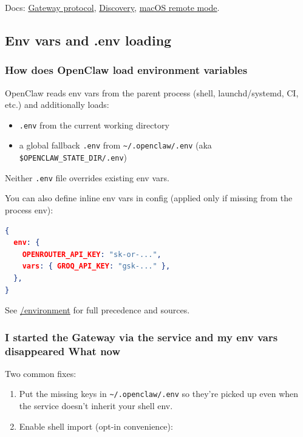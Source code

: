 Docs: \href{/gateway/protocol}{Gateway protocol}, \href{/gateway/discovery}{Discovery}, \href{/platforms/mac/remote}{macOS remote mode}.

\subsection{Env vars and .env loading}


\subsubsection{How does OpenClaw load environment variables}


OpenClaw reads env vars from the parent process (shell, launchd/systemd, CI, etc.) and additionally loads:

\begin{itemize}
  \item \texttt{.env} from the current working directory
  \item a global fallback \texttt{.env} from \texttt{\textasciitilde{}/.openclaw/.env} (aka \texttt{\$OPENCLAW\_STATE\_DIR/.env})
\end{itemize}


Neither \texttt{.env} file overrides existing env vars.

You can also define inline env vars in config (applied only if missing from the process env):

\begin{lstlisting}[language=json]
{
  env: {
    OPENROUTER_API_KEY: "sk-or-...",
    vars: { GROQ_API_KEY: "gsk-..." },
  },
}
\end{lstlisting}


See \href{/help/environment}{/environment} for full precedence and sources.

\subsubsection{I started the Gateway via the service and my env vars disappeared What now}


Two common fixes:

\begin{enumerate}
  \item Put the missing keys in \texttt{\textasciitilde{}/.openclaw/.env} so they're picked up even when the service doesn't inherit your shell env.
  \item Enable shell import (opt-in convenience):
\end{enumerate}


